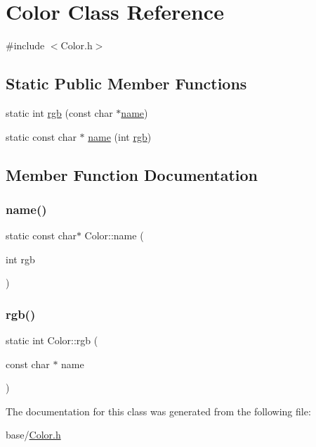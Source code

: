\hypertarget{classColor}{}\section{Color Class Reference}
\label{classColor}


{\ttfamily \#include $<$Color.\+h$>$}

\subsection*{Static Public Member Functions}
\begin{DoxyCompactItemize}
\item 
static int \mbox{\hyperlink{classColor_a8aa2c2bf182f1b251fe44c87af8dea96}{rgb}} (const char $\ast$\mbox{\hyperlink{classColor_a39f4696913051c0537bda59d967be348}{name}})
\item 
static const char $\ast$ \mbox{\hyperlink{classColor_a39f4696913051c0537bda59d967be348}{name}} (int \mbox{\hyperlink{classColor_a8aa2c2bf182f1b251fe44c87af8dea96}{rgb}})
\end{DoxyCompactItemize}


\subsection{Member Function Documentation}
\mbox{\label{classColor_a39f4696913051c0537bda59d967be348}} 
\subsubsection{\texorpdfstring{name()}{name()}}
{\footnotesize\ttfamily static const char$\ast$ Color\+::name (\begin{DoxyParamCaption}\item[{int}]{rgb }\end{DoxyParamCaption})\hspace{0.3cm}{\ttfamily [static]}}

\mbox{\label{classColor_a8aa2c2bf182f1b251fe44c87af8dea96}} 
\subsubsection{\texorpdfstring{rgb()}{rgb()}}
{\footnotesize\ttfamily static int Color\+::rgb (\begin{DoxyParamCaption}\item[{const char $\ast$}]{name }\end{DoxyParamCaption})\hspace{0.3cm}{\ttfamily [static]}}



The documentation for this class was generated from the following file\+:\begin{DoxyCompactItemize}
\item 
base/\mbox{\hyperlink{Color_8h}{Color.\+h}}\end{DoxyCompactItemize}
